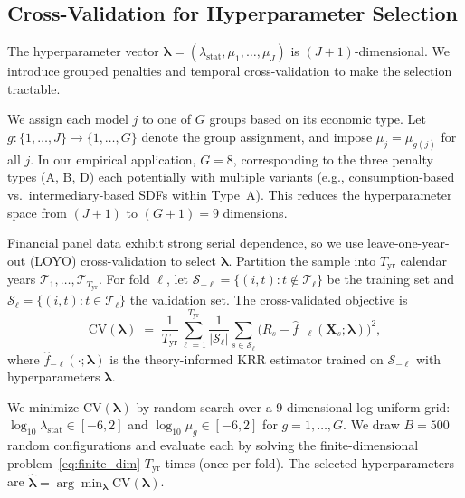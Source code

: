 \subsection{Cross-Validation for Hyperparameter Selection}
\label{sub:cv}

The hyperparameter vector
$\boldsymbol{\lambda} = (\lambda_{\mathrm{stat}}, \mu_1, \ldots, \mu_J)$
is $(J+1)$-dimensional.
We introduce grouped penalties and temporal cross-validation
to make the selection tractable.

We assign each model $j$ to one of $G$ groups based on its
economic type.  Let $g: \{1, \ldots, J\} \to \{1, \ldots, G\}$
denote the group assignment, and impose $\mu_j = \mu_{g(j)}$
for all $j$.  In our empirical application, $G = 8$, corresponding to
the three penalty types (A, B, D) each potentially with multiple variants
(e.g., consumption-based vs.\ intermediary-based SDFs within Type~A).
This reduces the hyperparameter space from $(J+1)$ to $(G+1) = 9$ dimensions.

Financial panel data exhibit strong serial dependence, so we use
leave-one-year-out (LOYO) cross-validation to select $\boldsymbol{\lambda}$.
Partition the sample into $T_{\mathrm{yr}}$ calendar years
$\mathcal{T}_1, \ldots, \mathcal{T}_{T_{\mathrm{yr}}}$.
For fold $\ell$, let
$\mathcal{S}_{-\ell} = \{(i,t) : t \notin \mathcal{T}_\ell\}$ be the
training set and $\mathcal{S}_\ell = \{(i,t) : t \in \mathcal{T}_\ell\}$
the validation set.
The cross-validated objective is
\begin{equation}
\label{eq:cv}
\mathrm{CV}(\boldsymbol{\lambda}) \;=\;
\frac{1}{T_{\mathrm{yr}}} \sum_{\ell=1}^{T_{\mathrm{yr}}}
\frac{1}{|\mathcal{S}_\ell|}
\sum_{s \in \mathcal{S}_\ell}
\bigl(R_s - \hat{f}_{-\ell}(\mathbf{X}_s; \boldsymbol{\lambda})\bigr)^2,
\end{equation}
where $\hat{f}_{-\ell}(\cdot; \boldsymbol{\lambda})$ is the theory-informed
KRR estimator trained on $\mathcal{S}_{-\ell}$ with hyperparameters
$\boldsymbol{\lambda}$.

We minimize $\mathrm{CV}(\boldsymbol{\lambda})$ by random search over
a 9-dimensional log-uniform grid:
$\log_{10}\lambda_{\mathrm{stat}} \in [-6, 2]$ and
$\log_{10}\mu_g \in [-6, 2]$ for $g = 1, \ldots, G$.
We draw $B = 500$ random configurations and evaluate each by solving
the finite-dimensional problem~\eqref{eq:finite_dim} $T_{\mathrm{yr}}$
times (once per fold).
The selected hyperparameters are
$\hat{\boldsymbol{\lambda}} = \arg\min_{\boldsymbol{\lambda}}
\mathrm{CV}(\boldsymbol{\lambda})$.

